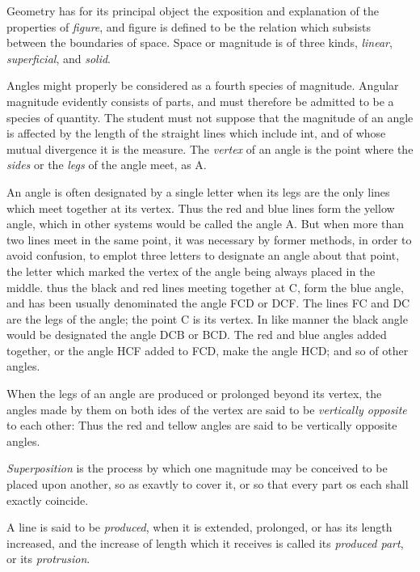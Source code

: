		Geometry has for its principal object the exposition and explanation of the properties of \textit{figure}, and figure is defined to be the relation which subsists between the boundaries of space. Space or magnitude is of three kinds, \textit{linear}, \textit{superficial}, and \textit{solid}. 

		Angles might properly be considered as a fourth species of magnitude. Angular magnitude evidently consists of parts, and must therefore be admitted to be a species of quantity. The student must not suppose that the magnitude of an angle is affected by the length of the straight lines which include int, and of whose mutual divergence it is the measure. The \textit{vertex} of an angle is the point where the \textit{sides} or the \textit{legs} of the angle meet, as A. 

		An angle is often designated by a single letter when its legs are the only lines which meet together at its vertex. Thus the red and blue lines form the yellow angle, which in other systems would be called the angle A. But when more than two lines meet in the same point, it was necessary by former methods, in order to avoid confusion, to emplot three letters to designate an angle about that point, the letter which marked the vertex of the angle being always placed in the middle. thus the black and red lines meeting together at C, form the blue angle, and has been usually denominated the angle FCD or DCF. The lines FC and DC are the legs of the angle; the point C is its vertex. In like manner the black angle would be designated the angle DCB or BCD. The red and blue angles added together, or the angle HCF added to FCD, make the angle HCD; and so of other angles. 

When the legs of an angle are produced or prolonged beyond its vertex, the angles made by them on both ides of the vertex are said to be \textit{vertically opposite} to each other: Thus the red and tellow angles are said to be vertically opposite angles. 

\textit{Superposition} is the process by which one magnitude may be conceived to be placed upon another, so as exavtly to cover it, or so that every part os each shall exactly coincide. 

A line is said to be \textit{produced}, when it is extended, prolonged, or has its length increased, and the increase of length which it receives is called its \textit{produced part}, or its \textit{protrusion}. 

